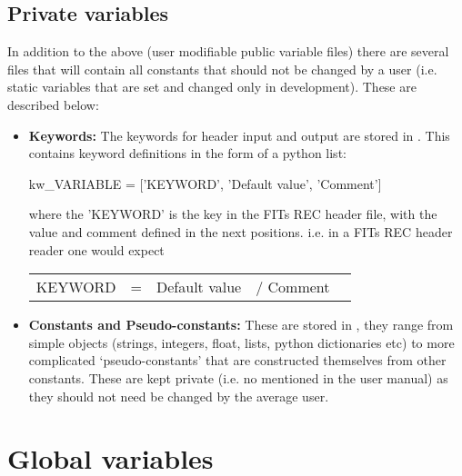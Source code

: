 \ifdevguide
\subsection{Private variables}

\noindent In addition to the above (user modifiable public variable files) there are several files that will contain all constants that should not be changed by a user (i.e. static variables that are set and changed only in development). These are described below:

\begin{itemize}

	\item \textbf{Keywords:} The keywords for header input and output are stored in \spirouKeywords. This contains keyword definitions in the form of a python list:  \\

	\begin{pythonbox}
	kw_VARIABLE = ['KEYWORD', 'Default value', 'Comment']
	\end{pythonbox}

	\noindent where the 'KEYWORD' is the key in the FITs REC header file, with the value and comment defined in the next positions. i.e. in a FITs REC header reader one would expect

	\begin{thighlight}
	\begin{tabular}{l c r c l}
	KEYWORD & = & Default value & / Comment \\
	\end{tabular}
	\end{thighlight}


	\item \textbf{Constants and Pseudo-constants:} These are stored in \spirouCONST, they range from simple objects (strings, integers, float, lists, python dictionaries etc) to more complicated `pseudo-constants' that are constructed themselves from other constants. These are kept private (i.e. no mentioned in the user manual) as they should not need be changed by the average user.

\end{itemize}

\fi

\section{Global variables}
\label{ch:variables:global}


